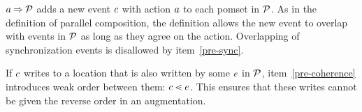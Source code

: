 \begin{definition}
\begin{enumerate}
\end{enumerate}
\end{definition}


$a\mathbin\Rightarrow\mathcal{P}$ adds a new event $c$ with action $a$ to each
pomset in $\mathcal{P}$.  As in the definition of parallel composition, the
definition allows the new event to overlap with events in $\mathcal{P}$ as long as
they agree on the action.  Overlapping of synchronization events is
disallowed by item~\ref{pre-sync}.

If $c$ writes to a location that is also written by some $e$ in $\mathcal{P}$,
item~\ref{pre-coherence} introduces weak order between them: $c \lessdot e$.  This
ensures that these writes cannot be given the reverse order in an augmentation.

